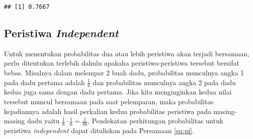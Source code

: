 \documentclass[]{book}
\newenvironment{Shaded}{\begin{snugshade}}{\end{snugshade}}
\newcommand{\KeywordTok}[1]{\textcolor[rgb]{0.13,0.29,0.53}{\textbf{#1}}}
\newcommand{\DataTypeTok}[1]{\textcolor[rgb]{0.13,0.29,0.53}{#1}}
\newcommand{\DecValTok}[1]{\textcolor[rgb]{0.00,0.00,0.81}{#1}}
\newcommand{\StringTok}[1]{\textcolor[rgb]{0.31,0.60,0.02}{#1}}
\newcommand{\CommentTok}[1]{\textcolor[rgb]{0.56,0.35,0.01}{\textit{#1}}}
\newcommand{\OperatorTok}[1]{\textcolor[rgb]{0.81,0.36,0.00}{\textbf{#1}}}
\newcommand{\NormalTok}[1]{#1}
\begin{document}
\begin{Shaded}
\end{Shaded}

\begin{verbatim}
## [1] 0.7667
\end{verbatim}

\subsection{\texorpdfstring{Peristiwa
\emph{Independent}}{Peristiwa Independent}}\label{peristiwa-independent}

Untuk menentukan probabilitas dua atau lebih peristiwa akan terjadi
bersamaan, perlu ditentukan terlebih dahulu apakaha peristiwa-peristiwa
tersebut bersifat bebas. Misalnya dalam melempar 2 buah dadu,
probabilitas munculnya angka 1 pada dadu pertama adalah \(\frac{1}{6}\)
dan probabilitas munculnya angka 2 pada dadu kedua juga sama dengan dadu
pertama. Jika kita menginginkan kedua nilai tersebut muncul bersamaan
pada saat pelemparan, maka probabilitas kejadiannya adalah hasil
perkalian kedua probabilitas peristiwa pada masing-masing dadu yaitu
\(\frac{1}{6}\cdot\frac{1}{6}=\frac{1}{36}\). Pendekatan perhitungan
probabilitas untuk peristiwa \emph{independent} dapat dituliskan pada
Persamaan \eqref{eq:pi}.
\end{document}
